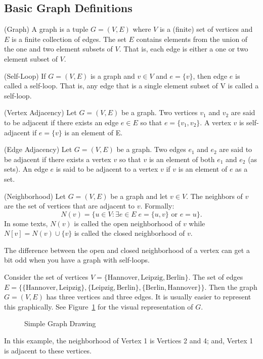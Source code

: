 \subsection{Basic Graph Definitions}
%
\begin{definition}{(Graph)}\label{def:graph}
A graph is a tuple \(G = (V,E)\) where \(V\) is a (finite) set of vertices and \(E\) is a finite collection of edges.
The set \(E\) contains elements from the union of the one and two element subsets of \(V\).
That is, each edge is either a one or two element subset of \(V\).
\end{definition}
%
\begin{definition}{(Self-Loop)}
If \(G = (V,E)\) is a graph and \(v\in V\) and \(e = \{v\}\), then edge \(e\) is called a self-loop.
That is, any edge that is a single element subset of V is called a self-loop.
\end{definition}
%
\begin{definition}{(Vertex Adjacency)}
Let \(G = (V,E)\) be a graph.
Two vertices \(v_1\) and \(v_2\) are said to be adjacent if there exists an edge \(e \in E\) so that \(e = \{v_1, v_2\}\).
A vertex \(v\) is self-adjacent if \( e = \{v\}\) is an element of E.
\end{definition}
%
\begin{definition}{(Edge Adjacency)}
Let \(G = (V, E)\) be a graph.
Two edges \(e_1\) and \(e_2\) are said to be adjacent if there exists a vertex \(v\) so that \(v\) is an element of both \(e_1\) and \(e_2\) (as sets).
An edge \(e\) is said to be adjacent to a vertex \(v\) if \(v\) is an element of \(e\) as a set.
\end{definition}
%
\begin{definition}{(Neighborhood)}
Let \(G = (V,E)\) be a graph and let \(v\in V\).
The neighbors of \(v\) are the set of vertices that are adjacent to \(v\).
Formally:
\[ N(v)=\{u\in V: \exists e\in E\; e=\{u,v\} \mbox{ or } e={u}\}. \]
In some texts, \(N(v)\) is called the open neighborhood of \(v\) while \(N[v] = N(v) \cup \{v\}\) is called the closed neighborhood of \(v\).
\end{definition}

%
\begin{remark}
The difference between the open and closed neighborhood of a vertex can get a bit odd when you have a graph with self-loops.

\end{remark}
%
\begin{example}\label{ex1}
Consider the set of vertices \(V = \{\text{Hannover}, \text{Leipzig}, \text{Berlin}\}\).
The set of edges \(E = \{\{\text{Hannover}, \text{Leipzig}\}, \{\text{Leipzig}, \text{Berlin}\}, \{\text{Berlin},\text{Hannover} \}\}\).
Then the graph \(G = (V, E)\) has three vertices and three edges.
It is usually easier to represent this graphically.
See Figure~\ref{fig:g1} for the visual representation of \(G\).
%
\begin{figure}
\centering

\caption{\label{fig:g1} Simple Graph Drawing}
\end{figure}
%
In this example, the neighborhood of Vertex 1 is Vertices 2 and 4; and, Vertex 1 is adjacent to these vertices.
\end{example}

